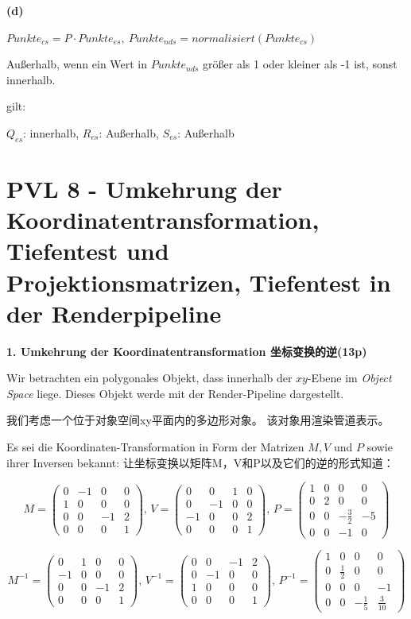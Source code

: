\documentclass[fleqn]{article}
\begin{document}
\indent\textbf{(d)}

$Punkte_{cs} = P \cdot Punkte_{es}, \
Punkte_{nds} = normalisiert(Punkte_{cs})$

Außerhalb, wenn ein Wert in $Punkte_{nds}$ größer als 1 oder kleiner als -1 ist, sonst innerhalb.

gilt:

$Q_{es}$: innerhalb, $R_{es}$: Außerhalb, $S_{es}$: Außerhalb

\newpage

\section{PVL 8 - Umkehrung der Koordinatentransformation, Tiefentest und Projektionsmatrizen, Tiefentest in der Renderpipeline}

\noindent\textbf{1. Umkehrung der Koordinatentransformation 坐标变换的逆(13p)}

Wir betrachten ein polygonales Objekt, dass innerhalb der $xy$-Ebene im \textit{Object Space} liege.
 Dieses Objekt werde mit der Render-Pipeline dargestellt. 

 我们考虑一个位于对象空间xy平面内的多边形对象。 该对象用渲染管道表示。

Es sei die Koordinaten-Transformation in Form der Matrizen $M, V$ und $P$ sowie ihrer Inversen bekannt:
让坐标变换以矩阵M，V和P以及它们的逆的形式知道：

$$M=\begin{pmatrix}
    0&-1&0&0\\
    1&0&0&0\\
    0&0&-1&2\\
    0&0&0&1
\end{pmatrix},\,V=\begin{pmatrix}
    0&0&1&0\\
    0&-1&0&0\\
    -1&0&0&2\\
    0&0&0&1
\end{pmatrix},\,P=\begin{pmatrix}
    1&0&0&0\\
    0&2&0&0\\
    0&0&-\frac{3}{2}&-5\\
    0&0&-1&0
\end{pmatrix}$$

$$M^{-1}=\begin{pmatrix}
    0&1&0&0\\
    -1&0&0&0\\
    0&0&-1&2\\
    0&0&0&1
\end{pmatrix},\,V^{-1}=\begin{pmatrix}
    0&0&-1&2\\
    0&-1&0&0\\
    1&0&0&0\\
    0&0&0&1
\end{pmatrix},\,P^{-1}=\begin{pmatrix}
    1&0&0&0\\
    0&\frac{1}{2}&0&0\\
    0&0&0&-1\\
    0&0&-\frac{1}{5}&\frac{3}{10}
\end{pmatrix}$$
\end{document}
